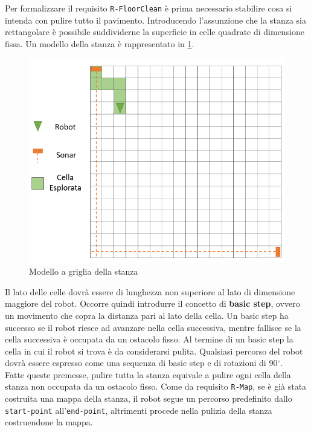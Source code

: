\documentclass{llncs}
\newcommand{\code}[1]{{\color{blue}\small{\texttt{#1}}}}
\begin{document}
Per formalizzare il requisito \code{R-FloorClean} è prima necessario stabilire cosa si intenda con pulire tutto il pavimento. Introducendo l'assunzione che la stanza sia rettangolare è possibile suddividerne la superficie in celle quadrate di dimensione fissa. Un modello della stanza è rappresentato in \ref{fig:grid}. 

\begin{figure}[h!]
	\centering
	\includegraphics[scale=0.5]{img/grid.PNG}
	\caption{Modello a griglia della stanza}
	\label{fig:grid}
\end{figure}

Il lato delle celle dovrà essere di lunghezza non superiore al lato di dimensione maggiore del robot. Occorre quindi introdurre il concetto di \textbf{basic step}, ovvero un movimento che copra la distanza pari al lato della cella. Un basic step ha successo se il robot riesce ad avanzare nella cella successiva, mentre fallisce se la cella successiva è occupata da un ostacolo fisso. Al termine di un basic step la cella in cui il robot si trova è da considerarsi pulita. Qualsiasi percorso del robot dovrà essere espresso come una sequenza di basic step e di rotazioni di 90$^{\circ}$. \\ Fatte queste premesse, pulire tutta la stanza equivale a pulire ogni cella della stanza non occupata da un ostacolo fisso. Come da requisito \code{R-Map}, se è già stata costruita una mappa della stanza, il robot segue un percorso predefinito dallo \code{start-point} all'\code{end-point}, altrimenti procede nella pulizia della stanza costruendone la mappa. 
\end{document}
